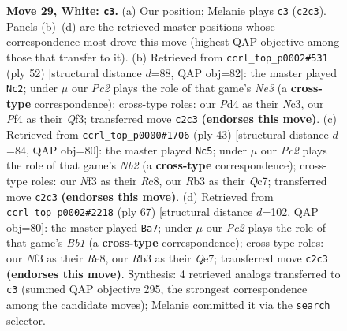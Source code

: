 \documentclass[11pt]{article}
\begin{document}
\begin{figure}[p]
\caption{\textbf{Move 29, White: \texttt{c3}.} (a) Our position; Melanie plays \texttt{c3} (\texttt{c2c3}). Panels (b)--(d) are the retrieved master positions whose correspondence most drove this move (highest QAP objective among those that transfer to it). (b) Retrieved from \texttt{ccrl\_top\_p0002\#531} (ply 52) [structural distance $d$=88, QAP obj=82]: the master played \texttt{Nc2}; under $\mu$ our \emph{Pc2} plays the role of that game's \emph{Ne3} (a \textbf{cross-type} correspondence); cross-type roles: our \emph{P}d4 as their \emph{N}c3, our \emph{P}f4 as their \emph{Q}f3; transferred move \texttt{c2c3} \textbf{(endorses this move)}. (c) Retrieved from \texttt{ccrl\_top\_p0000\#1706} (ply 43) [structural distance $d$=84, QAP obj=80]: the master played \texttt{Nc5}; under $\mu$ our \emph{Pc2} plays the role of that game's \emph{Nb2} (a \textbf{cross-type} correspondence); cross-type roles: our \emph{N}f3 as their \emph{R}c8, our \emph{R}b3 as their \emph{Q}c7; transferred move \texttt{c2c3} \textbf{(endorses this move)}. (d) Retrieved from \texttt{ccrl\_top\_p0002\#2218} (ply 67) [structural distance $d$=102, QAP obj=80]: the master played \texttt{Ba7}; under $\mu$ our \emph{Pc2} plays the role of that game's \emph{Bb1} (a \textbf{cross-type} correspondence); cross-type roles: our \emph{N}f3 as their \emph{R}e8, our \emph{R}b3 as their \emph{Q}e7; transferred move \texttt{c2c3} \textbf{(endorses this move)}. Synthesis: 4 retrieved analogs transferred to \texttt{c3} (summed QAP objective 295, the strongest correspondence among the candidate moves); Melanie committed it via the \texttt{search} selector.}
\label{fig:thought-m56}
\end{figure}

\clearpage
\end{document}
